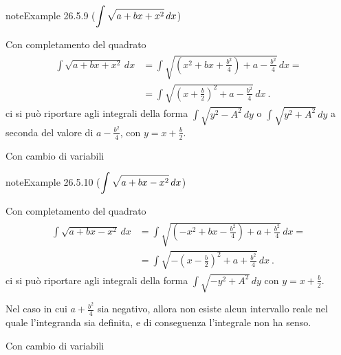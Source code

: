 \documentclass[letterpaper,10pt,italian]{jupyterBook}
\begin{document}
\label{ch/infinitesimal_calculus/integrals:integrals-methods-sub-8}
\begin{sphinxadmonition}{note}{Example 26.5.9 (\protect\(\displaystyle \int \sqrt{a + bx + x^2} \, dx \protect\))}



\sphinxAtStartPar
{} Con completamento del quadrato
\begin{equation*}
\begin{split}\begin{aligned}
  \int \sqrt{a + bx + x^2} \, dx 
  & = \int \sqrt{ \left( x^2 + b x + \frac{b^2}{4} \right) + a - \frac{b^2}{4}} \, dx = \\
  & = \int \sqrt{ \left( x + \frac{b}{2} \right)^2 + a - \frac{b^2}{4}} \, dx \ .
\end{aligned}\end{split}
\end{equation*}
\sphinxAtStartPar
ci si può riportare agli integrali della forma \(\displaystyle \int \sqrt{y^2 - A^2} \, dy\) o \(\displaystyle \int \sqrt{y^2 + A^2} \, dy\) a seconda del valore di \(a - \frac{b^2}{4}\), con \(y = x+ \frac{b}{2}\).

\sphinxAtStartPar
{} Con cambio di variabili
\end{sphinxadmonition}
\label{ch/infinitesimal_calculus/integrals:integrals-methods-sub-9}
\begin{sphinxadmonition}{note}{Example 26.5.10 (\protect\(\displaystyle \int \sqrt{a + bx - x^2} \, dx \protect\))}



\sphinxAtStartPar
{} Con completamento del quadrato
\begin{equation*}
\begin{split}\begin{aligned}
  \int \sqrt{a + bx - x^2} \, dx 
  & = \int \sqrt{ \left( - x^2 + b x - \frac{b^2}{4} \right) + a + \frac{b^2}{4}} \, dx = \\
  & = \int \sqrt{-\left( x - \frac{b}{2} \right)^2 + a + \frac{b^2}{4}} \, dx \ .
\end{aligned}\end{split}
\end{equation*}
\sphinxAtStartPar
ci si può riportare agli integrali della forma \(\displaystyle \int \sqrt{-y^2 + A^2} \, dy\) con \(y = x+ \frac{b}{2}\).

\sphinxAtStartPar
{} Nel caso in cui \(a + \frac{b^2}{4}\) sia negativo, allora non esiste alcun intervallo reale nel quale l’integranda sia definita, e di conseguenza l’integrale non ha senso.

\sphinxAtStartPar
{} Con cambio di variabili
\end{sphinxadmonition}
\end{document}
